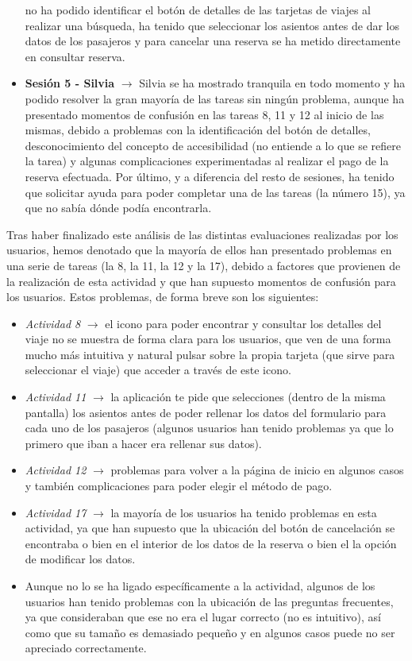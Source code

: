 \begin{itemize}
          no ha podido identificar el botón de detalles de las tarjetas de viajes al realizar una búsqueda, ha tenido que seleccionar los asientos antes de dar los datos de los
          pasajeros y para cancelar una reserva se ha metido directamente en consultar reserva.
    \item \textbf{Sesión 5 - Silvia} $\rightarrow$ Silvia se ha mostrado tranquila en todo momento y ha podido resolver la gran mayoría de las tareas sin ningún problema,
          aunque ha presentado momentos de confusión en las tareas 8, 11 y 12 al inicio de las mismas, debido a problemas con la identificación del botón de detalles, desconocimiento del
          concepto de accesibilidad (no entiende a lo que se refiere la tarea) y algunas complicaciones experimentadas al realizar el pago de la reserva efectuada. Por último, y a
          diferencia del resto de sesiones, ha tenido que solicitar ayuda para poder completar una de las tareas (la número 15), ya que no sabía dónde podía encontrarla.
\end{itemize}

Tras haber finalizado este análisis de las distintas evaluaciones realizadas por los usuarios, hemos denotado que la mayoría de ellos han presentado problemas en una serie
de tareas (la 8, la 11, la 12 y la 17), debido a factores que provienen de la realización de esta actividad y que han supuesto momentos de confusión para los usuarios. Estos problemas,
de forma breve son los siguientes:
\begin{itemize}
    \item \textit{Actividad 8} $\rightarrow$ el icono para poder encontrar y consultar los detalles del viaje no se muestra de forma clara para los usuarios, que ven de una forma mucho
          más intuitiva y natural pulsar sobre la propia tarjeta (que sirve para seleccionar el viaje) que acceder a través de este icono.
    \item \textit{Actividad 11} $\rightarrow$ la aplicación te pide que selecciones (dentro de la misma pantalla) los asientos antes de poder rellenar los datos del formulario para cada
          uno de los pasajeros (algunos usuarios han tenido problemas ya que lo primero que iban a hacer era rellenar sus datos).
    \item \textit{Actividad 12} $\rightarrow$ problemas para volver a la página de inicio en algunos casos y también complicaciones para poder elegir el método de pago.
    \item \textit{Actividad 17} $\rightarrow$ la mayoría de los usuarios ha tenido problemas en esta actividad, ya que han supuesto que la ubicación del botón de cancelación
          se encontraba o bien en el interior de los datos de la reserva o bien el la opción de modificar los datos.
    \item Aunque no lo se ha ligado específicamente a la actividad, algunos de los usuarios han tenido problemas con la ubicación de las preguntas frecuentes, ya que consideraban que ese no era
          el lugar correcto (no es intuitivo), así como que su tamaño es demasiado pequeño y en algunos casos puede no ser apreciado correctamente.
\end{itemize}

